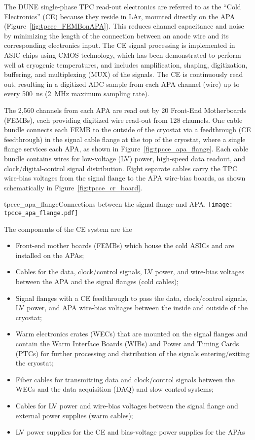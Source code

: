 The DUNE single-phase TPC read-out electronics are referred to as the ``Cold Electronics'' (CE) because they reside in LAr,
mounted directly on the APA (Figure~\ref{fig:tpcce_FEMBonAPA}).
This reduces channel capacitance and noise by minimizing the length of the connection between an anode wire
and its corresponding electronics input.
The CE signal processing is implemented in ASIC chips using CMOS technology,
which has been demonstrated to perform well at cryogenic temperatures,
and includes amplification, shaping, digitization, buffering, and multiplexing (MUX) of the signals.
The CE is continuously read out,
resulting in a digitized ADC sample from each APA channel (wire) up to every 500~ns (2~MHz maximum sampling rate).

The 2,560 channels from each APA are read out by 20 Front-End Motherboards (FEMBs), each providing 
digitized wire read-out from 128 channels. One cable bundle 
connects each FEMB to the outside of the cryostat via a feedthrough (CE feedthrough) in the signal cable flange at the top of the cryostat, where a single flange services each APA, as shown in Figure~\ref{fig:tpcce_apa_flange}. 
Each cable bundle contains wires for low-voltage (LV) power, high-speed data readout,
and clock/digital-control signal distribution.
Eight separate cables carry the TPC wire-bias voltages from the signal flange to the APA wire-bias boards, as
shown schematically in Figure~\ref{fig:tpcce_cr_board}.

\begin{cdrfigure}{tpcce_apa_flange}{Connections between
the signal flange and APA.}
\texttt{[image: tpcce\_apa\_flange.pdf]}
\end{cdrfigure}

The components of the CE system are the
\begin{itemize}
\item Front-end mother boards (FEMBs) which house the cold ASICs and are installed on the APAs;
\item Cables for the data, clock/control signals, LV power, and wire-bias voltages 
between the APA and the signal flanges (cold cables);
\item Signal flanges with a CE feedthrough to pass the data, clock/control signals, 
LV power, and APA wire-bias voltages between the inside and outside of the cryostat;
\item Warm electronics crates (WECs) that are mounted on the signal flanges and contain the Warm Interface Boards (WIBs)
and Power and Timing Cards (PTCs) for further processing and distribution of the signals entering/exiting the cryostat;
\item Fiber cables for transmitting data and clock/control signals between the WECs and the data acquisition 
(DAQ) and slow control systems;
\item Cables for LV power and wire-bias voltages between the signal flange and external power supplies (warm cables);
\item LV power supplies for the CE and bias-voltage power supplies for the APAs
\end{itemize}


